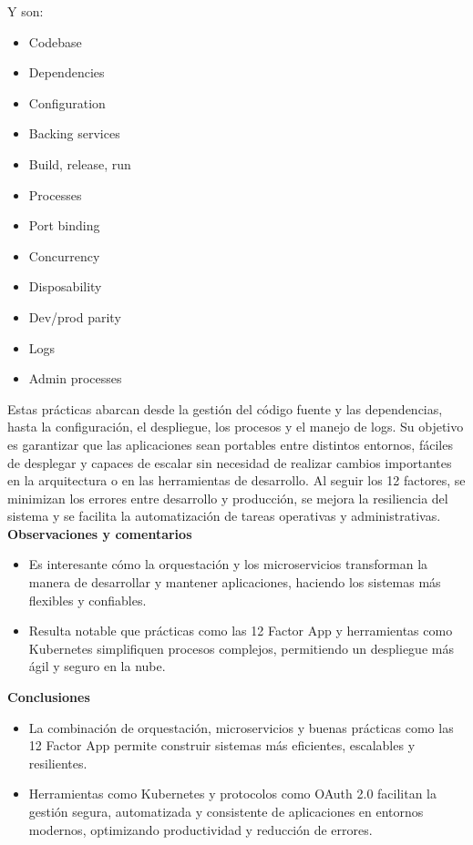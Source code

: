 \documentclass[12pt]{article}
\begin{document}
Y son:
\begin{itemize}
    \item Codebase
    \item Dependencies
    \item Configuration
    \item Backing services
    \item Build, release, run
    \item Processes
    \item Port binding
    \item Concurrency
    \item Disposability
    \item Dev/prod parity
    \item Logs
    \item Admin processes
\end{itemize}
Estas prácticas abarcan desde la gestión del código fuente y las dependencias, hasta la configuración, el despliegue, los procesos y el manejo de logs. Su objetivo es garantizar que las aplicaciones sean portables entre distintos entornos, fáciles de desplegar y capaces de escalar sin necesidad de realizar cambios importantes en la arquitectura o en las herramientas de desarrollo. Al seguir los 12 factores, se minimizan los errores entre desarrollo y producción, se mejora la resiliencia del sistema y se facilita la automatización de tareas operativas y administrativas.\\

\noindent\textbf{Observaciones y comentarios} 
\begin{itemize}
    \item{Es interesante cómo la orquestación y los microservicios transforman la manera de desarrollar y mantener aplicaciones, haciendo los sistemas más flexibles y confiables.}
    \item{Resulta notable que prácticas como las 12 Factor App y herramientas como Kubernetes simplifiquen procesos complejos, permitiendo un despliegue más ágil y seguro en la nube.}
\end{itemize}

\noindent\textbf{Conclusiones} 
\begin{itemize}
    \item{La combinación de orquestación, microservicios y buenas prácticas como las 12 Factor App permite construir sistemas más eficientes, escalables y resilientes.}
    \item {Herramientas como Kubernetes y protocolos como OAuth 2.0 facilitan la gestión segura, automatizada y consistente de aplicaciones en entornos modernos, optimizando productividad y reducción de errores.}
\end{itemize}
\end{document}
